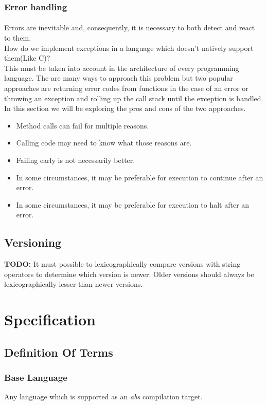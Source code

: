 \documentclass[hidelinks]{article}
\begin{document}
\subsubsection{Error handling}
\paragraph{}Errors are inevitable and, consequently, it is necessary to both detect and react to them. 
\\
How do we implement exceptions in a language which doesn't natively support them(Like C)?
\\
This must be taken into account in the architecture of every programming language. The are many ways to approach this problem but two popular approaches are returning error codes from functions in the case of an error or throwing an exception and rolling up the call stack until the exception is handled. In this section we will be exploring the pros and cons of the two approaches.

\begin{itemize}
\item Method calls can fail for multiple reasons.
\item Calling code may need to know what those reasons are.
\item Failing early is not necessarily better.
\item In some circumstances, it may be preferable for execution to continue after an error.
\item In some circumstances, it may be preferable for execution to halt after an error.
\end{itemize}
\subsection{Versioning}
\textbf{TODO: }It must possible to lexicographically compare versions with string operators to determine which version is newer. Older versions should always be lexicographically lesser than newer versions.
\newpage
\section{Specification}
\subsection{Definition Of Terms}
\subsubsection{Base Language}
Any language which is supported as an \textit{abs} compilation target.
\end{document}
